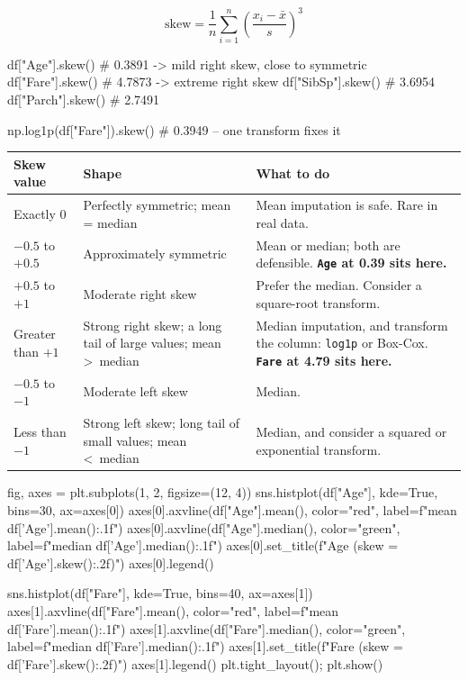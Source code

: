 \documentclass[11pt,a4paper]{article}
\begin{document}
\[
  \mathrm{skew} = \frac{1}{n}\sum_{i=1}^{n}\left(\frac{x_i - \bar{x}}{s}\right)^{3}
\]

\begin{py}
df["Age"].skew()      # 0.3891  -> mild right skew, close to symmetric
df["Fare"].skew()     # 4.7873  -> extreme right skew
df["SibSp"].skew()    # 3.6954
df["Parch"].skew()    # 2.7491

np.log1p(df["Fare"]).skew()   # 0.3949 -- one transform fixes it
\end{py}

\begin{tabularx}{\textwidth}{@{}l l X@{}}
\toprule
\rowcolor{tablehead} \textbf{Skew value} & \textbf{Shape} & \textbf{What to do} \\
\midrule
Exactly 0 & Perfectly symmetric; mean = median & Mean imputation is safe. Rare in real data. \\
$-0.5$ to $+0.5$ & Approximately symmetric & Mean or median; both are defensible. \textbf{\texttt{Age} at 0.39 sits here.} \\
$+0.5$ to $+1$ & Moderate right skew & Prefer the median. Consider a square-root transform. \\
Greater than $+1$ & Strong right skew; a long tail of large values; mean \textgreater\ median & Median imputation, and transform the column: \lstinline|log1p| or Box-Cox. \textbf{\texttt{Fare} at 4.79 sits here.} \\
$-0.5$ to $-1$ & Moderate left skew & Median. \\
Less than $-1$ & Strong left skew; long tail of small values; mean \textless\ median & Median, and consider a squared or exponential transform. \\
\bottomrule
\end{tabularx}


\begin{py}
fig, axes = plt.subplots(1, 2, figsize=(12, 4))
sns.histplot(df["Age"], kde=True, bins=30, ax=axes[0])
axes[0].axvline(df["Age"].mean(),   color="red",   label=f"mean {df['Age'].mean():.1f}")
axes[0].axvline(df["Age"].median(), color="green", label=f"median {df['Age'].median():.1f}")
axes[0].set_title(f"Age  (skew = {df['Age'].skew():.2f})")
axes[0].legend()

sns.histplot(df["Fare"], kde=True, bins=40, ax=axes[1])
axes[1].axvline(df["Fare"].mean(),   color="red",   label=f"mean {df['Fare'].mean():.1f}")
axes[1].axvline(df["Fare"].median(), color="green", label=f"median {df['Fare'].median():.1f}")
axes[1].set_title(f"Fare (skew = {df['Fare'].skew():.2f})")
axes[1].legend()
plt.tight_layout(); plt.show()
\end{py}
\end{document}
